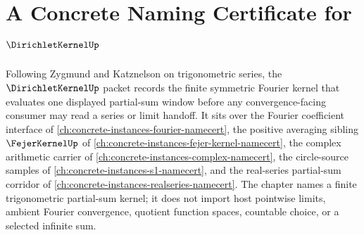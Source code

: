 \chapter{A Concrete Naming Certificate for $\DirichletKernelUp$}
\label{ch:concrete-instances-dirichlet-kernel-namecert}

Following Zygmund and Katznelson on trigonometric series, the $\DirichletKernelUp$ packet records the finite symmetric Fourier kernel that evaluates one displayed partial-sum window before any convergence-facing consumer may read a series or limit handoff. It sits over the Fourier coefficient interface of \autoref{ch:concrete-instances-fourier-namecert}, the positive averaging sibling $\FejerKernelUp$ of \autoref{ch:concrete-instances-fejer-kernel-namecert}, the complex arithmetic carrier of \autoref{ch:concrete-instances-complex-namecert}, the circle-source samples of \autoref{ch:concrete-instances-s1-namecert}, and the real-series partial-sum corridor of \autoref{ch:concrete-instances-realseries-namecert}. The chapter names a finite trigonometric partial-sum kernel; it does not import host pointwise limits, ambient Fourier convergence, quotient function spaces, countable choice, or a selected infinite sum.

